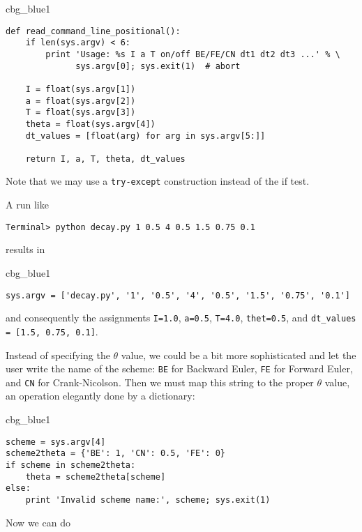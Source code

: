 \documentclass[graybox,sectrefs,envcountresetchap,open=right,final]{svmonodo}
\newenvironment{_cod_tight}[1]{
   \def\FrameCommand{\colorbox{#1}}
   \FrameRule0.6pt\MakeFramed {\FrameRestore}\vskip3mm}
   {\vskip0mm\endMakeFramed}
\newenvironment{cod}[1]{
\bgroup\rmfamily
\fboxsep=0mm\relax
\begin{_cod_tight}{#1}
\list{}{\parsep=-2mm\parskip=0mm\topsep=0pt\leftmargin=2mm
\rightmargin=2\leftmargin\leftmargin=4pt\relax}
\item\relax}
{\endlist\end{_cod_tight}\egroup}
\begin{document}
\begin{cod}{cbg_blue1}\begin{Verbatim}[numbers=none,fontsize=\fontsize{9pt}{9pt},baselinestretch=0.95,xleftmargin=2mm]
def read_command_line_positional():
    if len(sys.argv) < 6:
        print 'Usage: %s I a T on/off BE/FE/CN dt1 dt2 dt3 ...' % \ 
              sys.argv[0]; sys.exit(1)  # abort

    I = float(sys.argv[1])
    a = float(sys.argv[2])
    T = float(sys.argv[3])
    theta = float(sys.argv[4])
    dt_values = [float(arg) for arg in sys.argv[5:]]

    return I, a, T, theta, dt_values
\end{Verbatim}
\end{cod}
\noindent
Note that we may use a \texttt{try-except} construction instead of the if test.

A run like

\begin{Verbatim}[frame=lines,label=\fbox{{\tiny Terminal}},framesep=2.5mm,framerule=0.7pt,fontsize=\fontsize{9pt}{9pt}]
Terminal> python decay.py 1 0.5 4 0.5 1.5 0.75 0.1
\end{Verbatim}
results in

\begin{cod}{cbg_blue1}\begin{Verbatim}[numbers=none,fontsize=\fontsize{9pt}{9pt},baselinestretch=0.95,xleftmargin=2mm]
sys.argv = ['decay.py', '1', '0.5', '4', '0.5', '1.5', '0.75', '0.1']
\end{Verbatim}
\end{cod}
\noindent
and consequently the assignments \texttt{I=1.0}, \texttt{a=0.5}, \texttt{T=4.0}, \texttt{thet=0.5},
and \Verb!dt_values = [1.5, 0.75, 0.1]!.

Instead of specifying the $\theta$ value, we could be a bit more
sophisticated and let the user write the name of the scheme:
\texttt{BE} for Backward Euler, \texttt{FE} for Forward Euler, and \texttt{CN}
for Crank-Nicolson. Then we must map this string to the proper
$\theta$ value, an operation elegantly done by a dictionary:

\begin{cod}{cbg_blue1}\begin{Verbatim}[numbers=none,fontsize=\fontsize{9pt}{9pt},baselinestretch=0.95,xleftmargin=2mm]
scheme = sys.argv[4]
scheme2theta = {'BE': 1, 'CN': 0.5, 'FE': 0}
if scheme in scheme2theta:
    theta = scheme2theta[scheme]
else:
    print 'Invalid scheme name:', scheme; sys.exit(1)
\end{Verbatim}
\end{cod}
\noindent
Now we can do
\end{document}

